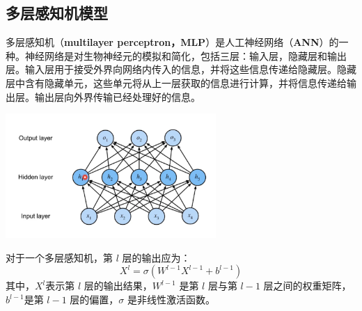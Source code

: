     \subsection{多层感知机模型}
        \par 多层感知机（\textbf{multilayer perceptron，MLP}）是人工神经网络（\textbf{ANN}）的一种。神经网络是对生物神经元的模拟和简化，包括三层：输入层，隐藏层和输出层。输入层用于接受外界向网络内传入的信息，并将这些信息传递给隐藏层。隐藏层中含有隐藏单元，这些单元将从上一层获取的信息进行计算，并将信息传递给输出层。输出层向外界传输已经处理好的信息\cite{ref5}。
        \begin{minipage}{\linewidth}
            \begin{center}
                \includegraphics*[width = 0.6\textwidth]{MLP.jpg}
            \end{center}
        \end{minipage}
        \vspace*{1em}
        \par 对于一个多层感知机，第 $l$ 层的输出应为： $$X^l = \sigma(W^{l-1}X^{l-1} + b^{l-1})$$ 其中，$X^l$表示第 $l$ 层的输出结果，$W^{l-1}$ 是第 $l$ 层与第 $l-1$ 层之间的权重矩阵，$b^{l-1}$是第 $l-1$ 层的偏置，$\sigma$ 是非线性激活函数。
        

